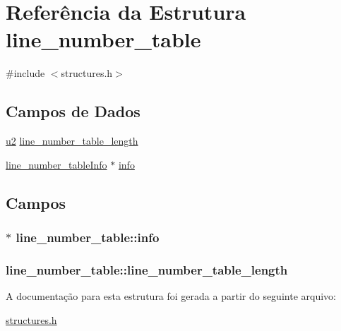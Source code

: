 \hypertarget{structline__number__table}{}\section{Referência da Estrutura line\+\_\+number\+\_\+table}
\label{structline__number__table}


{\ttfamily \#include $<$structures.\+h$>$}

\subsection*{Campos de Dados}
\begin{DoxyCompactItemize}
\item 
\hyperlink{lista__operandos_8h_a732cde1300aafb73b0ea6c2558a7a54f}{u2} \hyperlink{structline__number__table_abe258fd7b751d3d72da9b207afd11beb}{line\+\_\+number\+\_\+table\+\_\+length}
\item 
\hyperlink{structline__number__tableInfo}{line\+\_\+number\+\_\+table\+Info} $\ast$ \hyperlink{structline__number__table_a1d2c6e92d6243f7753d153cc11313ad9}{info}
\end{DoxyCompactItemize}


\subsection{Campos}
\subsubsection[{\texorpdfstring{info}{info}}]{$\ast$ line\+\_\+number\+\_\+table\+::info}\hypertarget{structline__number__table_a1d2c6e92d6243f7753d153cc11313ad9}{}\label{structline__number__table_a1d2c6e92d6243f7753d153cc11313ad9}
\subsubsection[{\texorpdfstring{line\+\_\+number\+\_\+table\+\_\+length}{line_number_table_length}}]{ line\+\_\+number\+\_\+table\+::line\+\_\+number\+\_\+table\+\_\+length}\hypertarget{structline__number__table_abe258fd7b751d3d72da9b207afd11beb}{}\label{structline__number__table_abe258fd7b751d3d72da9b207afd11beb}


A documentação para esta estrutura foi gerada a partir do seguinte arquivo\+:\begin{DoxyCompactItemize}
\item 
\hyperlink{structures_8h}{structures.\+h}\end{DoxyCompactItemize}
